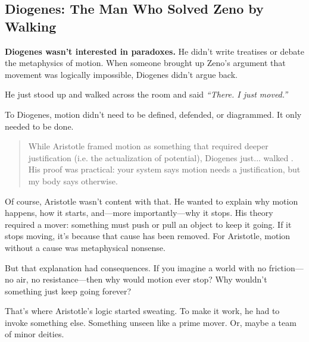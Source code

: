 \subsection{Diogenes: The Man Who Solved Zeno by Walking}

\textbf{Diogenes wasn’t interested in paradoxes.} He didn’t write treatises or debate the metaphysics of motion. When someone brought up Zeno’s argument that movement was logically impossible, Diogenes didn’t argue back.  

He just stood up and walked across the room and said \textit{“There. I just moved.”}

To Diogenes, motion didn’t need to be defined, defended, or diagrammed. It only needed to be done.

\begin{quote}
While Aristotle framed motion as something that required deeper justification (i.e. the actualization of potential), Diogenes just... walked . His proof was practical: your system says motion needs a justification, but my body says otherwise.
\end{quote}

Of course, Aristotle wasn’t content with that. He wanted to explain why motion happens, how it starts, and—more importantly—why it stops. His theory required a mover: something must push or pull an object to keep it going. If it stops moving, it’s because that cause has been removed. For Aristotle, motion without a cause was metaphysical nonsense.

But that explanation had consequences.  If you imagine a world with no friction—no air, no resistance—then why would motion ever stop? Why wouldn’t something just keep going forever?

That’s where Aristotle’s logic started sweating. To make it work, he had to invoke something else. Something unseen like a prime mover. Or, maybe a team of minor deities. 

